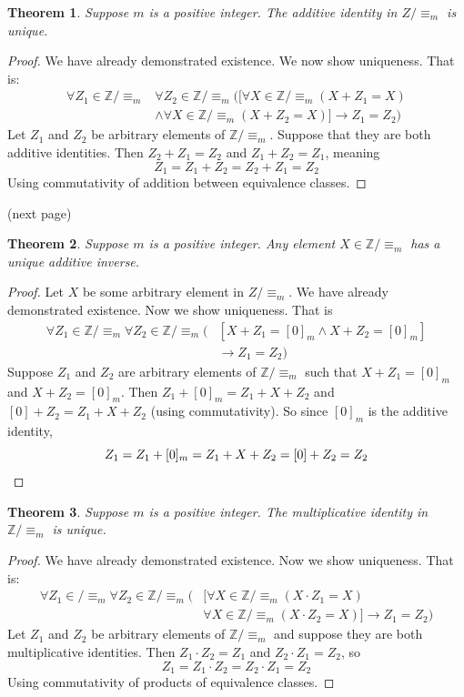 \documentclass{report}
\newtheorem*{theorem}{Theorem}
\theoremstyle{definition}
\begin{document}
\begin{theorem}
Suppose $m$ is a positive integer. The additive identity in $Z/\equiv_m$ is unique.
\end{theorem}
\begin{proof}
We have already demonstrated existence. We now show uniqueness. That is:
\begin{align*}
\forall Z_1\in\mathbb Z/\equiv_m&\forall Z_2\in\mathbb Z/\equiv_m([\forall X\in\mathbb Z/\equiv_m(X+Z_1=X)\\
&\land\forall X\in\mathbb Z/\equiv_m(X+Z_2=X)]\to Z_1=Z_2)
\end{align*}
Let $Z_1$ and $Z_2$ be arbitrary elements of $\mathbb Z/\equiv_m$. Suppose that they are both additive identities. Then $Z_2+Z_1=Z_2$ and $Z_1+Z_2=Z_1$, meaning
\begin{equation*}
Z_1=Z_1+Z_2=Z_2+Z_1=Z_2
\end{equation*}
Using commutativity of addition between equivalence classes.
\end{proof}
\noindent(next page)\newpage
\begin{theorem}
Suppose $m$ is a positive integer. Any element $X\in\mathbb Z/\equiv_m$ has a unique additive inverse.
\end{theorem}
\begin{proof}
Let $X$ be some arbitrary element in $Z/\equiv_m$.
We have already demonstrated existence. Now we show uniqueness. That is
\begin{align*}
\forall Z_1\in\mathbb Z/\equiv_m\forall Z_2\in\mathbb Z/\equiv_m(&[X+Z_1=[0]_m\land X+Z_2=[0]_m]\\
&\to Z_1=Z_2)
\end{align*}
Suppose $Z_1$ and $Z_2$ are arbitrary elements of $\mathbb Z/\equiv_m$ such that $X+Z_1=[0]_m$ and 
$X+Z_2=[0]_m$. Then
$Z_1+[0]_m=Z_1+X+Z_2$ and $[0]+Z_2=Z_1+X+Z_2$ (using commutativity).
So since $[0]_m$ is the additive identity,
\begin{equation*}
Z_1=Z_1+[0]_m=Z_1+X+Z_2=[0]+Z_2=Z_2\qedhere
\end{equation*}
\end{proof}
\begin{theorem}
Suppose $m$ is a positive integer. The multiplicative identity in $\mathbb Z/\equiv_m$ is unique.
\end{theorem}
\begin{proof}
We have already demonstrated existence. Now we show uniqueness. That is:
\begin{align*}
\forall Z_1\in\mathbb/\equiv_m\forall Z_2\in\mathbb Z/\equiv_m(&[\forall X\in\mathbb Z/\equiv_m(X\cdot Z_1=X)\\
&\forall X\in\mathbb Z/\equiv_m(X\cdot Z_2=X)]\to Z_1=Z_2)
\end{align*}
Let $Z_1$ and $Z_2$ be arbitrary elements of $\mathbb Z/\equiv_m$ and suppose they are both multiplicative identities. Then $Z_1\cdot Z_2=Z_1$ and $Z_2\cdot Z_1=Z_2$, so
\begin{equation*}
Z_1=Z_1\cdot Z_2=Z_2\cdot Z_1=Z_2
\end{equation*}
Using commutativity of products of equivalence classes.
\end{proof}
\end{document}
